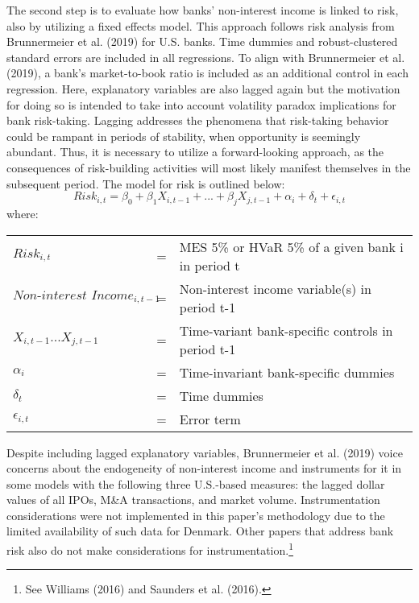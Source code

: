 \documentclass[10pt]{article} %
\begin{document}
\par The second step is to evaluate how banks' non-interest income is linked to risk, also by utilizing a fixed effects model. This approach follows risk analysis from Brunnermeier et al. (2019) for U.S. banks. Time dummies and robust-clustered standard errors are included in all regressions. To align with Brunnermeier et al. (2019), a bank's market-to-book ratio is included as an additional control in each regression. Here, explanatory variables are also lagged again but the motivation for doing so is intended to take into account volatility paradox implications for bank risk-taking. Lagging addresses the phenomena that risk-taking behavior could be rampant in periods of stability, when opportunity is seemingly abundant. Thus, it is necessary to utilize a forward-looking approach, as the consequences of risk-building activities will most likely manifest themselves in the subsequent period. The model for risk is outlined below: 
\begin{equation}
    Risk_{i,t} = \beta_0 +
    \beta_1X_{i,t-1} + ... + \beta_jX_{j,t-1} + \alpha_i + \delta_t + \epsilon_{i,t}
\end{equation}
where: 
\begin{center}\begin{tabular}{lll}\\
$Risk_{i,t}$ & = & MES 5\% or HVaR 5\% of a given bank i in period t \\
$\textit{Non-interest Income}_{i,t-1}$ & = & Non-interest income variable(s) in period t-1 \\ 
$X_{i,t-1}...X_{j,t-1}$ & = & Time-variant bank-specific controls in period t-1 \\
$\alpha_i$ & = & Time-invariant bank-specific dummies \\ 
$\delta_t$ & = & Time dummies \\
$\epsilon_{i,t}$ & = & Error term
\end{tabular}\end{center}
\par Despite including lagged explanatory variables, Brunnermeier et al. (2019) voice concerns about the endogeneity of non-interest income and instruments for it in some models with the following three U.S.-based measures: the lagged dollar values of all IPOs, M\&A transactions, and market volume. Instrumentation considerations were not implemented in this paper's methodology due to the limited availability of such data for Denmark. Other papers that address bank risk also do not make considerations for instrumentation.\footnote{See Williams (2016) and Saunders et al. (2016).}
\end{document}
